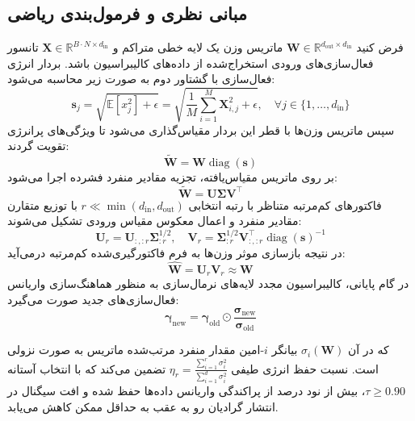 \subsection{مبانی نظری و فرمول‌بندی ریاضی}
فرض کنید $\mathbf{W} \in \mathbb{R}^{d_{\text{out}} \times d_{\text{in}}}$ ماتریس وزن یک لایه خطی متراکم و $\mathbf{X} \in \mathbb{R}^{B \cdot N \times d_{\text{in}}}$ تانسور فعال‌سازی‌های ورودی استخراج‌شده از داده‌های کالیبراسیون باشد. بردار انرژی فعال‌سازی با گشتاور دوم به صورت زیر محاسبه می‌شود:
\begin{equation}
\mathbf{s}_j = \sqrt{\mathbb{E}[x_j^2] + \epsilon} = \sqrt{\frac{1}{M}\sum_{i=1}^M \mathbf{X}_{i, j}^2 + \epsilon}, \quad \forall j \in \{1, \dots, d_{\text{in}}\}
\end{equation}
سپس ماتریس وزن‌ها با قطر این بردار مقیاس‌گذاری می‌شود تا ویژگی‌های پرانرژی تقویت گردند:
\begin{equation}
\tilde{\mathbf{W}} = \mathbf{W} \operatorname{diag}(\mathbf{s})
\end{equation}
بر روی ماتریس مقیاس‌یافته، تجزیه مقادیر منفرد فشرده اجرا می‌شود:
\begin{equation}
\tilde{\mathbf{W}} = \mathbf{U} \mathbf{\Sigma} \mathbf{V}^\top
\end{equation}
فاکتورهای کم‌مرتبه متناظر با رتبه انتخابی $r \ll \min(d_{\text{in}}, d_{\text{out}})$ با توزیع متقارن مقادیر منفرد و اعمال معکوس مقیاس ورودی تشکیل می‌شوند:
\begin{equation}
\mathbf{U}_r = \mathbf{U}_{:, :r} \mathbf{\Sigma}_{:r}^{1/2}, \quad \mathbf{V}_r = \mathbf{\Sigma}_{:r}^{1/2} \mathbf{V}_{:, :r}^\top \operatorname{diag}(\mathbf{s})^{-1}
\end{equation}
در نتیجه بازسازی موثر وزن‌ها به فرم فاکتورگیری‌شده کم‌مرتبه درمی‌آید:
\begin{equation}
\hat{\mathbf{W}} = \mathbf{U}_r \mathbf{V}_r \approx \mathbf{W}
\end{equation}
در گام پایانی، کالیبراسیون مجدد لایه‌های نرمال‌سازی به منظور هماهنگ‌سازی واریانس فعال‌سازی‌های جدید صورت می‌گیرد:
\begin{equation}
\boldsymbol{\gamma}_{\text{new}} = \boldsymbol{\gamma}_{\text{old}} \odot \frac{\boldsymbol{\sigma}_{\text{new}}}{\boldsymbol{\sigma}_{\text{old}}}
\end{equation}

که در آن $\sigma_i(\mathbf{W})$ بیانگر $i$-امین مقدار منفرد مرتب‌شده ماتریس به صورت نزولی است. نسبت حفظ انرژی طیفی $\eta_r = \frac{\sum_{i=1}^r \sigma_i^2}{\sum_{i=1}^{d} \sigma_i^2}$ تضمین می‌کند که با انتخاب آستانه $\tau \ge 0.90$، بیش از نود درصد از پراکندگی واریانس داده‌ها حفظ شده و افت سیگنال در انتشار گرادیان رو به عقب به حداقل ممکن کاهش می‌یابد.

